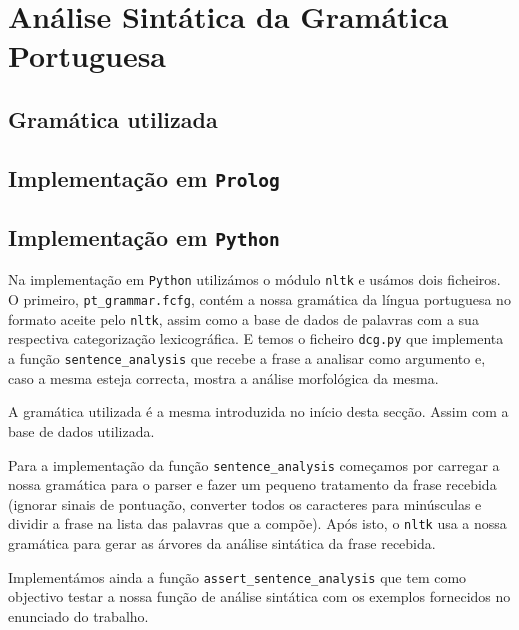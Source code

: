 \documentclass[12pt,a4paper,oneside]{article}
\begin{document}
\section{Análise Sintática da Gramática Portuguesa}
\label{sec:sin}

\lipsum[1]

\subsection{Gramática utilizada}

\lipsum[1]

\lipsum[2]

\lipsum[3]


\subsection{Implementação em \texttt{Prolog}}

\lipsum[1]

\lipsum[2]

\lipsum[3]

\subsection{Implementação em \texttt{Python}}

Na implementação em \texttt{Python} utilizámos o módulo \texttt{nltk} e
usámos dois ficheiros. O primeiro, \texttt{pt\_grammar.fcfg}, contém a nossa
gramática da língua portuguesa no formato aceite pelo \texttt{nltk}, assim como
a base de dados de palavras com a sua respectiva categorização lexicográfica.
E temos o ficheiro \texttt{dcg.py} que implementa a função \texttt{sentence\_analysis}
que recebe a frase a analisar como argumento e, caso a mesma esteja correcta, mostra
a análise morfológica da mesma.

A gramática utilizada é a mesma introduzida no início desta secção. Assim com a base
de dados utilizada.

Para a implementação da função \texttt{sentence\_analysis} começamos por carregar a
nossa gramática para o parser e fazer um pequeno tratamento da frase recebida (ignorar
sinais de pontuação, converter todos os caracteres para minúsculas e dividir a frase
na lista das palavras que a compõe). Após isto, o \texttt{nltk} usa a nossa gramática
para gerar as árvores da análise sintática da frase recebida.

Implementámos ainda a função \texttt{assert\_sentence\_analysis} que tem como objectivo
testar a nossa função de análise sintática com os exemplos fornecidos no enunciado do
trabalho.
\end{document}
